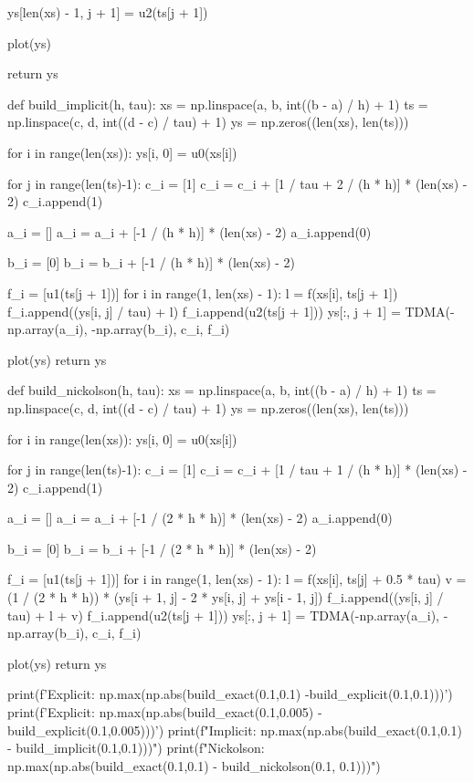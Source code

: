 \documentclass{article}
\begin{document}
\begin{python}
        ys[len(xs) - 1, j + 1] = u2(ts[j + 1])
    
    plot(ys)

    return ys

def build_implicit(h, tau):
    xs = np.linspace(a, b, int((b - a) / h) + 1)
    ts = np.linspace(c, d, int((d - c) / tau) + 1)
    ys = np.zeros((len(xs), len(ts)))
    
    for i in range(len(xs)):
        ys[i, 0] = u0(xs[i])
        
    for j in range(len(ts)-1):
        c_i = [1]
        c_i = c_i + [1 / tau + 2 / (h * h)] * (len(xs) - 2)
        c_i.append(1)
        
        a_i = []
        a_i = a_i + [-1 / (h * h)] * (len(xs) - 2)
        a_i.append(0)
        
        b_i = [0]
        b_i = b_i + [-1 / (h * h)] * (len(xs) - 2)
        
        f_i = [u1(ts[j + 1])]
        for i in range(1, len(xs) - 1):
            l = f(xs[i], ts[j + 1])
            f_i.append((ys[i, j] / tau) + l)
        f_i.append(u2(ts[j + 1]))
        ys[:, j + 1] = TDMA(-np.array(a_i), -np.array(b_i), c_i, f_i)

    plot(ys)
    return ys


def build_nickolson(h, tau):
    xs = np.linspace(a, b, int((b - a) / h) + 1)
    ts = np.linspace(c, d, int((d - c) / tau) + 1)
    ys = np.zeros((len(xs), len(ts)))
    
    for i in range(len(xs)):
        ys[i, 0] = u0(xs[i])
        
    for j in range(len(ts)-1):
        c_i = [1]
        c_i = c_i + [1 / tau + 1 / (h * h)] * (len(xs) - 2)
        c_i.append(1)
        
        a_i = []
        a_i = a_i + [-1 / (2 * h * h)] * (len(xs) - 2)
        a_i.append(0)
        
        b_i = [0]
        b_i = b_i + [-1 / (2 * h * h)] * (len(xs) - 2)
        
        f_i = [u1(ts[j + 1])]
        for i in range(1, len(xs) - 1):
            l = f(xs[i], ts[j] + 0.5 * tau)
            v = (1 / (2 * h * h)) * (ys[i + 1, j] - 2 * ys[i, j] + ys[i - 1, j])
            f_i.append((ys[i, j] / tau) + l + v)
        f_i.append(u2(ts[j + 1]))
        ys[:, j + 1] = TDMA(-np.array(a_i), -np.array(b_i), c_i, f_i) 

    plot(ys)
    return ys

print(f'Explicit: {np.max(np.abs(build_exact(0.1,0.1) -build_explicit(0.1,0.1)))}')
print(f'Explicit: {np.max(np.abs(build_exact(0.1,0.005) - build_explicit(0.1,0.005)))}')
print(f"Implicit: {np.max(np.abs(build_exact(0.1,0.1) - build_implicit(0.1,0.1)))}")
print(f"Nickolson: {np.max(np.abs(build_exact(0.1,0.1) - build_nickolson(0.1, 0.1)))}")
\end{python}
\end{document}
